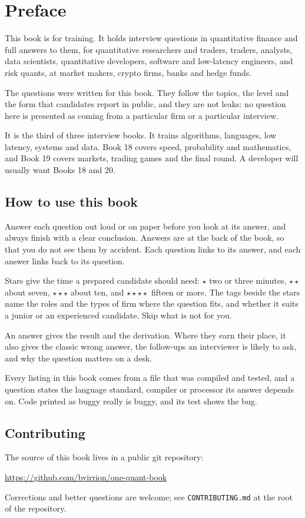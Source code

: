 \chapter{Preface}

This book is for training. It holds interview questions in quantitative finance and full answers to them, for
quantitative researchers and traders, traders, analysts, data scientists, quantitative developers, software and
low-latency engineers, and risk quants, at market makers, crypto firms, banks and hedge funds.

The questions were written for this book. They follow the topics, the level and the form that candidates report in
public, and they are not leaks: no question here is presented as coming from a particular firm or a particular
interview.

It is the third of three interview books. It trains algorithms, languages, low latency, systems and data. Book 18
covers speed, probability and mathematics, and Book 19 covers markets, trading games and the final round. A developer
will usually want Books 18 and 20.

\section*{How to use this book}

Answer each question out loud or on paper before you look at its answer, and always finish with a clear conclusion.
Answers are at the back of the book, so that you do not see them by accident. Each question links to its answer, and
each answer links back to its question.

Stars give the time a prepared candidate should need: $\star$ two or three minutes, $\star\star$ about seven,
$\star\star\star$ about ten, and $\star\star\star\star$ fifteen or more. The tags beside the stars name the roles and
the types of firm where the question fits, and whether it suits a junior or an experienced candidate. Skip what is not
for you.

An answer gives the result and the derivation. Where they earn their place, it also gives the classic wrong answer, the
follow-ups an interviewer is likely to ask, and why the question matters on a desk.

Every listing in this book comes from a file that was compiled and tested, and a question states the language standard,
compiler or processor its answer depends on. Code printed as buggy really is buggy, and its test shows the bug.


\section*{Contributing}

The source of this book lives in a public git repository:
\begin{center}
\url{https://github.com/bvirrion/one-quant-book}
\end{center}
Corrections and better questions are welcome; see \texttt{CONTRIBUTING.md} at the root of the repository.
